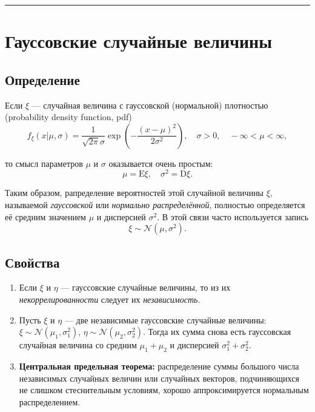 \documentclass[11pt,a4paper]{article}
\begin{document}
    \begin{center}\rule{0.5\linewidth}{0.5pt}\end{center}

    \hypertarget{ux433ux430ux443ux441ux441ux43eux432ux441ux43aux438ux435-ux441ux43bux443ux447ux430ux439ux43dux44bux435-ux432ux435ux43bux438ux447ux438ux43dux44b}{%
\section{Гауссовские случайные
величины}\label{ux433ux430ux443ux441ux441ux43eux432ux441ux43aux438ux435-ux441ux43bux443ux447ux430ux439ux43dux44bux435-ux432ux435ux43bux438ux447ux438ux43dux44b}}

\hypertarget{ux43eux43fux440ux435ux434ux435ux43bux435ux43dux438ux435}{%
\subsection{Определение}\label{ux43eux43fux440ux435ux434ux435ux43bux435ux43dux438ux435}}

Если \(\xi\) --- случайная величина с гауссовской (нормальной)
плотностью (probability density function, pdf)
\[
f_\xi(x|\mu,\sigma) = \frac{1}{\sqrt{2\pi}\sigma} \exp{ \left( -\frac{(x - \mu)^2}{2\sigma^2}\right)}, \quad \sigma>0, \quad -\infty < \mu < \infty,
\]

то смысл параметров \(\mu\) и \(\sigma\) оказывается очень простым:
\[ \mu = \mathrm{E} \xi, \quad \sigma^2 = \mathrm{D} \xi . \]

Таким образом, рапределение вероятностей этой случайной величины
\(\xi\), называемой \emph{гауссовской} или \emph{нормально
распределённой}, полностью определяется её средним значением \(\mu\) и
дисперсией \(\sigma^2\). В этой связи часто используется запись
\[ \xi \sim \mathcal{N}\left( \mu, \sigma^2 \right). \]

    \hypertarget{ux441ux432ux43eux439ux441ux442ux432ux430}{%
\subsection{Свойства}\label{ux441ux432ux43eux439ux441ux442ux432ux430}}

\begin{enumerate}
\def\labelenumi{\arabic{enumi}.}
\item
  Если \(\xi\) и \(\eta\) --- гауссовские случайные величины, то из их
  \emph{некоррелированности} следует их \emph{независимость}.
\item
  Пусть \(\xi\) и \(\eta\) --- две независимые гауссовские случайные
  величины: \(\xi \sim \mathcal{N}\left( \mu_1, \sigma_1^2 \right)\),
  \(\eta \sim \mathcal{N}\left( \mu_2, \sigma_2^2 \right)\). Тогда их
  сумма снова есть гауссовская случайная величина со средним
  \(\mu_1 + \mu_2\) и дисперсией \(\sigma_1^2 + \sigma_2^2\).
\item
  \textbf{Центральная предельная теорема:} распределение суммы большого
  числа независимых случайных величин или случайных векторов,
  подчиняющихся не слишком стеснительным условиям, хорошо
  аппроксимируется нормальным распределением.
\end{enumerate}
\end{document}
